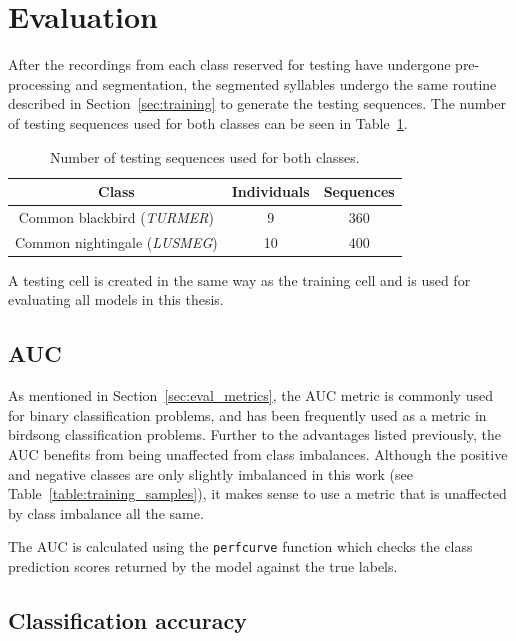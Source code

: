 \section{Evaluation}

After the recordings from each class reserved for testing have undergone
pre-processing and segmentation, the segmented syllables undergo the same
routine described in Section~\ref{sec:training} to generate the testing
sequences. The number of testing sequences used for both classes can be seen in
Table~\ref{table:testing_samples}.

\begin{table}[ht]
\begin{center}
\begin{tabular}{c c c}
\toprule
Class & Individuals & Sequences \\ [0.5ex]
\midrule
Common blackbird (\textit{TURMER}) & 9 & 360 \\
Common nightingale (\textit{LUSMEG}) & 10 & 400 \\
\bottomrule
\end{tabular}
\caption{Number of testing sequences used for both
classes.}\label{table:testing_samples}
\end{center}
\end{table}

A testing cell is created in the same way as the training cell and is used for
evaluating all models in this thesis.

\subsection{AUC}

As mentioned in Section~\ref{sec:eval_metrics}, the AUC metric is commonly used
for binary classification problems, and has been frequently used as a metric in
birdsong classification problems. Further to the advantages listed previously,
the AUC benefits from being unaffected from class imbalances. Although the
positive and negative classes are only slightly imbalanced in this work (see
Table~\ref{table:training_samples}), it makes sense to use a metric that is
unaffected by class imbalance all the same.

The AUC is calculated using the \texttt{perfcurve} function which checks the
class prediction scores returned by the model against the true labels.

\subsection{Classification accuracy}

